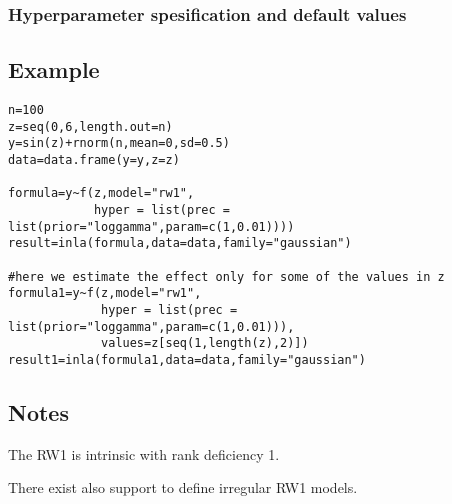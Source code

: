 \documentclass[a4paper,11pt]{article}
\begin{document}
\subsubsection*{Hyperparameter spesification and default values}



\subsection*{Example}

\begin{verbatim}
n=100
z=seq(0,6,length.out=n)
y=sin(z)+rnorm(n,mean=0,sd=0.5)
data=data.frame(y=y,z=z)

formula=y~f(z,model="rw1",
            hyper = list(prec = list(prior="loggamma",param=c(1,0.01))))
result=inla(formula,data=data,family="gaussian")

#here we estimate the effect only for some of the values in z
formula1=y~f(z,model="rw1",
             hyper = list(prec = list(prior="loggamma",param=c(1,0.01))),
             values=z[seq(1,length(z),2)])
result1=inla(formula1,data=data,family="gaussian")
\end{verbatim}


\subsection*{Notes}

The RW1 is intrinsic with rank deficiency 1.

There exist also support to define irregular RW1 models.
\end{document}
